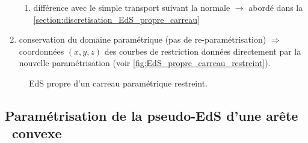 \begin{enumerate}
\begin{enumerate}
		\item différence avec le simple transport suivant la normale $\to$ abordé dans la \autoref{section:discretisation_EdS_propre_carreau}
	\end{enumerate}
	\item conservation du domaine paramétrique (pas de re-paramétrisation) $\Rightarrow$ coordonnées $(x,y,z)$ des courbes de restriction données directement par la nouvelle paramétrisation (voir \autoref{fig:EdS_propre_carreau_restreint}).
\end{enumerate}




\begin{figure}
	\centering
	
	\caption{EdS propre d'un carreau paramétrique restreint.}
	\label{fig:EdS_propre_carreau_restreint}
\end{figure}



\subsection{Paramétrisation de la pseudo-EdS d'une arête \brep\ convexe}%

